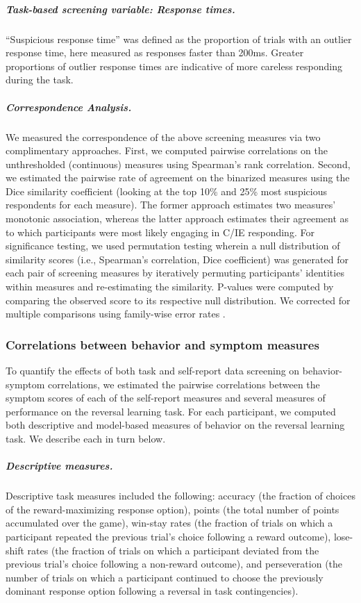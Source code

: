 \documentclass[a4paper,notitlepage,12pt]{article}
\begin{document}
\begin{refsection}[main]
\subparagraph{Task-based screening variable: Response times.} ``Suspicious response time'' was defined as the proportion of trials with an outlier response time, here measured as responses faster than 200ms. Greater proportions of outlier response times are indicative of more careless responding during the task.

\subparagraph{Correspondence Analysis.} We measured the correspondence of the above screening measures via two complimentary approaches. First, we computed pairwise correlations on the unthresholded (continuous) measures using Spearman's rank correlation. Second, we estimated the pairwise rate of agreement on the binarized measures using the Dice similarity coefficient (looking at the top 10\% and 25\% most suspicious respondents for each measure). The former approach estimates two measures' monotonic association, whereas the latter approach estimates their agreement as to which participants were most likely engaging in C/IE responding. For significance testing, we used permutation testing wherein a null distribution of similarity scores (i.e., Spearman's correlation, Dice coefficient) was generated for each pair of screening measures by iteratively permuting participants' identities within measures and re-estimating the similarity. P-values were computed by comparing the observed score to its respective null distribution. We corrected for multiple comparisons using family-wise error rates \cite{winkler2014permutation}.

\subsubsection*{Correlations between behavior and symptom measures}

To quantify the effects of both task and self-report data screening on behavior-symptom correlations, we estimated the pairwise correlations between the symptom scores of each of the self-report measures and several measures of performance on the reversal learning task. For each participant, we computed both descriptive and model-based measures of behavior on the reversal learning task. We describe each in turn below.

\subparagraph{Descriptive measures.} Descriptive task measures included the following: accuracy (the fraction of choices of the reward-maximizing response option), points (the total number of points accumulated over the game), win-stay rates (the fraction of trials on which a participant repeated the previous trial's choice following a reward outcome), lose-shift rates (the fraction of trials on which a participant deviated from the previous trial's choice following a non-reward outcome), and perseveration (the number of trials on which a participant continued to choose the previously dominant response option following a reversal in task contingencies).


\end{refsection}
\end{document}
